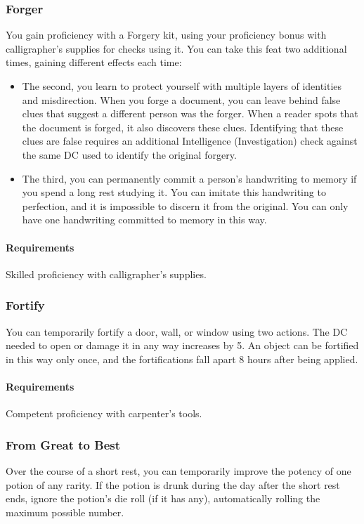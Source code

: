 \subsubsection{Forger} \label{feat::forger}
    You gain proficiency with a Forgery kit, using your proficiency bonus with calligrapher's supplies for checks using it.
    You can take this feat two additional times, gaining different effects each time:
    \begin{itemize}
        \item The second, you learn to protect yourself with multiple layers of identities and misdirection.
        When you forge a document, you can leave behind false clues that suggest a different person was the forger.
        When a reader spots that the document is forged, it also discovers these clues.
        Identifying that these clues are false requires an additional Intelligence (Investigation) check against the same DC used to identify the original forgery.
        \item The third, you can permanently commit a person's handwriting to memory if you spend a long rest studying it.
        You can imitate this handwriting to perfection, and it is impossible to discern it from the original.
        You can only have one handwriting committed to memory in this way.
    \end{itemize}
    \paragraph{Requirements} Skilled proficiency with calligrapher's supplies.
\subsubsection{Fortify} \label{feat::fortify}
    You can temporarily fortify a door, wall, or window using two actions.
    The DC needed to open or damage it in any way increases by 5.
    An object can be fortified in this way only once, and the fortifications fall apart 8 hours after being applied.
    \paragraph{Requirements} Competent proficiency with carpenter's tools.
\subsubsection{From Great to Best} \label{feat::fromgreattobest}
    Over the course of a short rest, you can temporarily improve the potency of one potion of any rarity.
    If the potion is drunk during the day after the short rest ends, ignore the potion's die roll (if it has any), automatically rolling the maximum possible number.

